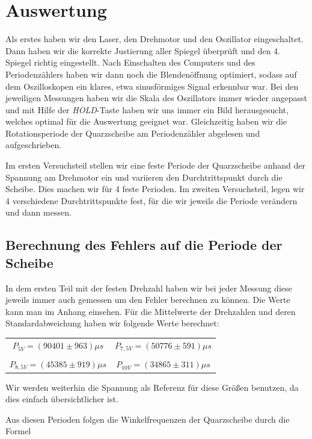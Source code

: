 \section{Auswertung}

Als erstes haben wir den Laser, den Drehmotor und den Oszillator eingeschaltet. Dann haben wir die korrekte Justierung aller Spiegel überprüft und den 4. Spiegel richtig eingestellt. Nach Einschalten des Computers und des Periodenzählers haben wir dann noch die Blendenöffnung optimiert, sodass auf dem Oszilloskopen ein klares, etwa sinusförmiges Signal erkennbar war. Bei den jeweiligen Messungen haben wir die Skala des Oszillators immer wieder angepasst und mit Hilfe der \emph{HOLD}-Taste haben wir uns immer ein Bild herausgesucht, welches optimal für die Auswertung geeignet war. Gleichzeitig haben wir die Rotationsperiode der Quarzscheibe am Periodenzähler abgelesen und aufgeschrieben.

Im ersten Versuchsteil stellen wir eine feste Periode der Quarzscheibe anhand der Spannung am Drehmotor ein und variieren den Durchtrittspunkt durch die Scheibe. Dies machen wir für 4 feste Perioden. Im zweiten Versuchsteil, legen wir 4 verschiedene Durchtrittspunkte fest, für die wir jeweils die Periode verändern und dann messen.

\subsection{Berechnung des Fehlers auf die Periode der Scheibe}

In dem ersten Teil mit der festen Drehzahl haben wir bei jeder Messung diese jeweils immer auch gemessen um den Fehler berechnen zu können. Die Werte kann man im Anhang einsehen. Für die Mittelwerte der Drehzahlen und deren Standardabweichung haben wir folgende Werte berechnet:

\begin{center}
\begin{tabular}[H]{c c}
$P_{5V}=(90401 \pm 963) \mu s$ & $P_{7,5V}=(50776 \pm 591) \mu s$ \\
 & \\
$P_{8,5V}=(45385 \pm 919) \mu s$ & $P_{10V}=(34865 \pm 311) \mu s$
\end{tabular}
\end{center}

Wir werden weiterhin die Spannung als Referenz für diese Größen benutzen, da dies einfach übersichtlicher ist.

Aus diesen Perioden folgen die Winkelfrequenzen der Quarzscheibe durch die Formel

